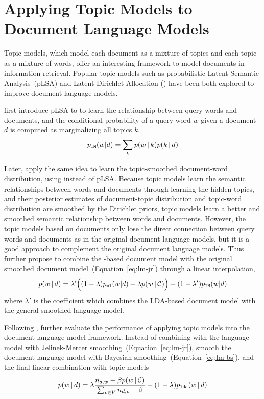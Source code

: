 \section{Applying Topic Models to Document Language Models}

Topic models, which model each document as a mixture of topics and
each topic as a mixture of words, offer an interesting framework to
model documents in information retrieval. Popular topic models such as
probabilistic Latent Semantic Analysis~(pLSA) and Latent Dirichlet Allocation ()
have been both explored to improve document language models.

\citet{hofmann-99a} first introduce pLSA to
to learn the relationship between query words and documents,
and the conditional probability of a query word $w$ given a document $d$ is
computed as marginalizing all topics $k$,
\begin{align}
p_{\texttt{TM}}(w|d) = \sum_{k} p(w \, | \, k) p(k \, | \, d)
\end{align}

Later, \citet{wei-06} apply the same idea to learn the topic-smoothed document-word
distribution, using  instead of pLSA.
Because topic models learn the semantic relationships between words
and documents through learning the hidden topics, and their posterior
estimates of document-topic distribution and topic-word distribution
are smoothed by the Dirichlet priors, topic models learn a better and
smoothed semantic relationship between words and documents. However,
the topic models based on documents only lose the direct connection
between query words and documents as in the original document language
models, but it is a good approach to complement the original document
language models. Thus \citet{wei-06} further propose to combine the
-based document model with the original smoothed document
model~(Equation~\ref{eq:lm-jr}) through a linear interpolation,
\begin{align}
p(w \, | \, d) = \lambda' \Big( (1 - \lambda) p_{\texttt{ml}}(w|d) + \lambda
p(w \, | \, \mathcal{C}) \Big) + (1 - \lambda') p_{\texttt{TM}}(w|d)
\end{align}
where $\lambda'$ is the coefficient which combines the LDA-based
document model with the general smoothed language model.

Following \citet{wei-06}, \citet{Lu-2011} further evaluate the
performance of applying topic models into the document language model
framework. Instead of combining with the language model with
Jelinek-Mercer smoothing~(Equation~\ref{eq:lm-jr}), \citet{Lu-2011}
smooth the document language model with Bayesian
smoothing~(Equation~\ref{eq:lm-bs}), and the final linear combination
with topic models
\begin{align}
p(w \, | \, d) = \lambda \frac{n_{d,w} + \beta p(w \, | \, \mathcal{C})}{\sum_{v
  \in V} n_{d,v} + \beta}  + (1 - \lambda) p_{\texttt{lda}}(w \, | \, d)
\end{align}

